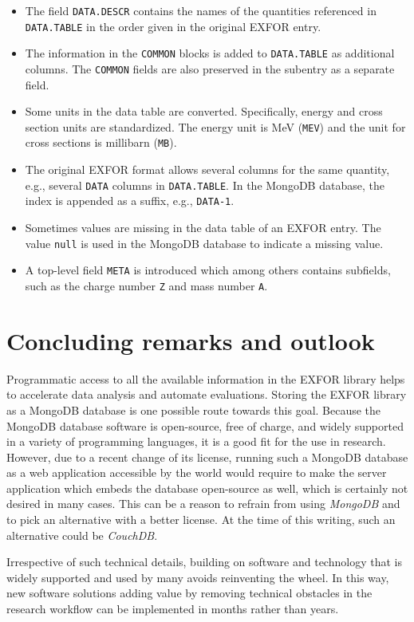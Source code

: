 \documentclass[12pt,a4paper]{scrartcl}
\begin{document}
\begin{itemize}
\item The field \verb|DATA.DESCR| contains the names of the quantities referenced in \verb|DATA.TABLE| in the order given in the original EXFOR entry.
\item The information in the \verb|COMMON| blocks is added to \verb|DATA.TABLE| as additional columns.
The \verb|COMMON| fields are also preserved in the subentry as a separate field.
\item Some units in the data table are converted. Specifically, energy and cross section units are standardized. The energy unit is MeV (\verb|MEV|) and the unit for cross sections is millibarn (\verb|MB|).
\item The original EXFOR format allows several columns for the same quantity, e.g., several \verb|DATA| columns in \verb|DATA.TABLE|.
In the MongoDB database, the index is appended as a suffix, e.g., \verb|DATA-1|.
\item Sometimes values are missing in the data table of an EXFOR entry.
The value \verb|null| is used in the MongoDB database to indicate a missing value.
\item A top-level field \verb|META| is introduced which among others contains subfields, such as the charge number \verb|Z| and mass number \verb|A|.
\end{itemize}  

\section{Concluding remarks and outlook}
\label{sec:conclusions}
Programmatic access to all the available information in the EXFOR library helps to accelerate data analysis and automate evaluations.
Storing the EXFOR library as a MongoDB database is one possible route towards this goal.
Because the MongoDB database software is open-source, free of charge, and widely supported in a variety of programming languages, it is a good fit for the use in research.
However, due to a recent change of its license, running such a MongoDB database as a web application accessible by the world would require to make the server application which embeds the database open-source as well, which is certainly not desired in many cases.
This can be a reason to refrain from using \textit{MongoDB} and to pick an alternative with a better license.
At the time of this writing, such an alternative could be \textit{CouchDB}.

Irrespective of such technical details, building on software and technology that is widely supported and used by many avoids reinventing the wheel.
In this way, new software solutions adding value by removing technical obstacles in the research workflow can be implemented in months rather than years.
\end{document}
